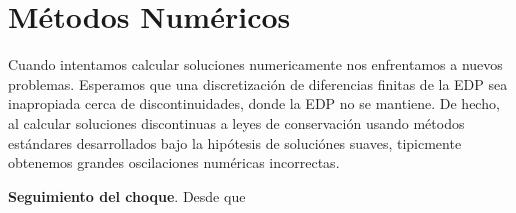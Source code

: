 \chapter{Métodos Numéricos}\label{cap:numericos}

Cuando intentamos calcular soluciones numericamente nos enfrentamos a nuevos problemas. Esperamos que una discretización de diferencias finitas de la EDP sea inapropiada cerca de discontinuidades, donde la EDP no se mantiene. De hecho, al calcular soluciones discontinuas a leyes de conservación usando métodos estándares desarrollados bajo la hipótesis de soluciónes suaves, tipicmente obtenemos grandes oscilaciones numéricas incorrectas.

\textbf{Seguimiento del choque}. Desde que 

\section{}

